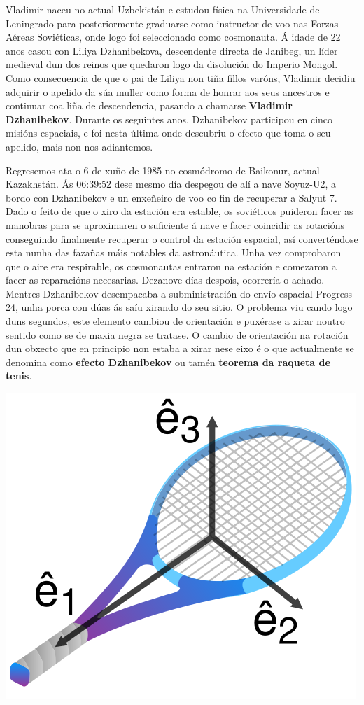 \begin{refsection}
\begin{multicols}{2}
Vladimir naceu no actual Uzbekistán e estudou física na Universidade de
Leningrado para posteriormente graduarse como instructor de voo nas Forzas
Aéreas Soviéticas, onde logo foi seleccionado como cosmonauta. Á idade de 22
anos casou con Liliya Dzhanibekova, descendente directa de Janibeg, un líder
medieval dun dos reinos que quedaron logo da disolución do Imperio Mongol. Como
consecuencia de que o pai de Liliya non tiña fillos varóns, Vladimir decidiu
adquirir o apelido da súa muller como forma de honrar aos seus ancestros e
continuar coa liña de descendencia, pasando a chamarse \textbf{Vladimir
Dzhanibekov}. Durante os seguintes anos, Dzhanibekov participou en cinco
misións espaciais, e foi nesta última onde descubriu o efecto que toma o seu
apelido, mais non nos adiantemos.

Regresemos ata o 6 de xuño de 1985 no cosmódromo de Baikonur, actual
Kazakhstán. Ás 06:39:52 dese mesmo día despegou de alí a nave Soyuz-U2, a bordo
con Dzhanibekov e un enxeñeiro de voo co fin de recuperar a Salyut 7. Dado o
feito de que o xiro da estación era estable, os soviéticos puideron facer as
manobras para se aproximaren o suficiente á nave e facer coincidir as rotacións
conseguindo finalmente recuperar o control da estación espacial, así
converténdose esta nunha das fazañas máis notables da astronáutica. Unha vez
comprobaron que o aire era respirable, os cosmonautas entraron na estación e
comezaron a facer as reparacións necesarias. Dezanove días despois, ocorrería o
achado. Mentres Dzhanibekov desempacaba a subministración do envío espacial
Progress-24, unha porca con dúas ás saíu xirando do seu sitio. O problema viu
cando logo duns segundos, este elemento cambiou de orientación e puxérase a
xirar noutro sentido como se de maxia negra se tratase. O cambio de orientación
na rotación dun obxecto que en principio non estaba a xirar nese eixo é o que
actualmente se denomina como \textbf{efecto Dzhanibekov} ou tamén
\textbf{teorema da raqueta de tenis}.\\

\begin{centering}
    \includegraphics[width=0.6\linewidth]{revistas/002/imaxes/Tennis_racquet.png}
    \label{fig:raqueta}
\end{centering}\vspace{10pt}


\end{multicols}
\end{refsection}
